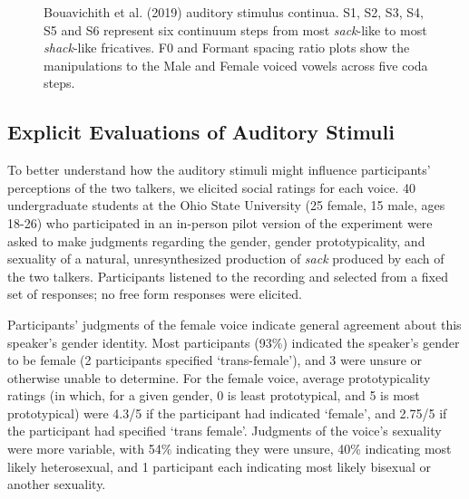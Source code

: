 \documentclass[
  letterpaper,
  DIV=11,
  numbers=noendperiod]{scrartcl}
\begin{document}
\begin{figure}


\caption{\label{fig-stimuli}Bouavichith et al. (2019) auditory stimulus
continua. S1, S2, S3, S4, S5 and S6 represent six continuum steps from
most \emph{sack}-like to most \emph{shack}-like fricatives. F0 and
Formant spacing ratio plots show the manipulations to the Male and
Female voiced vowels across five coda steps.}

\end{figure}%

\subsection{Explicit Evaluations of Auditory
Stimuli}\label{sec-stim-evals}

To better understand how the auditory stimuli might influence
participants' perceptions of the two talkers, we elicited social ratings
for each voice. 40 undergraduate students at the Ohio State University
(25 female, 15 male, ages 18-26) who participated in an in-person pilot
version of the experiment were asked to make judgments regarding the
gender, gender prototypicality, and sexuality of a natural,
unresynthesized production of \emph{sack} produced by each of the two
talkers. Participants listened to the recording and selected from a
fixed set of responses; no free form responses were elicited.

Participants' judgments of the female voice indicate general agreement
about this speaker's gender identity. Most participants (93\%) indicated
the speaker's gender to be female (2 participants specified
`trans-female'), and 3 were unsure or otherwise unable to determine. For
the female voice, average prototypicality ratings (in which, for a given
gender, 0 is least prototypical, and 5 is most prototypical) were 4.3/5
if the participant had indicated `female', and 2.75/5 if the participant
had specified `trans female'. Judgments of the voice's sexuality were
more variable, with 54\% indicating they were unsure, 40\% indicating
most likely heterosexual, and 1 participant each indicating most likely
bisexual or another sexuality.
\end{document}
